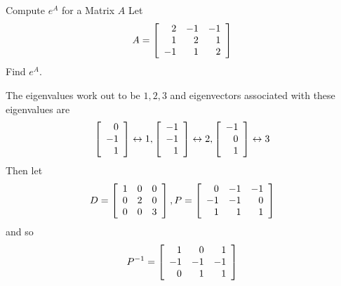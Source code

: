 \begin{example}{Compute $e^A$ for a Matrix $A$}{}
Let
\begin{equation*}
A=\left[
\begin{array}{rrr}
2 & -1 & -1 \\
1 & 2 & 1 \\
-1 & 1 & 2
\end{array}
\right]
\end{equation*}
Find $e^{A}$.
\end{example}

\begin{solution}
The eigenvalues work out to be $1,2,3$ and eigenvectors associated with these
eigenvalues are 
\begin{equation*}
\left[ 
\begin{array}{r}
0 \\ 
-1 \\ 
1
\end{array}
\right] \leftrightarrow 1,
\left[ 
\begin{array}{r}
-1 \\ 
-1 \\ 
1
\end{array}
\right] \leftrightarrow 2,\left[ 
\begin{array}{r}
-1 \\ 
0 \\ 
1
\end{array}
\right] \leftrightarrow 3
\end{equation*}
Then let 
\begin{equation*}
D=\left[ 
\begin{array}{rrr}
1 & 0 & 0 \\ 
0 & 2 & 0 \\ 
0 & 0 & 3
\end{array}
\right], P=\left[ 
\begin{array}{rrr}
0 & -1 & -1 \\ 
-1 & -1 & 0 \\ 
1 & 1 & 1
\end{array}
\right]
\end{equation*}
and so 
\begin{equation*}
P^{-1}=\left[ 
\begin{array}{rrr}
1 & 0 & 1 \\ 
-1 & -1 & -1 \\ 
0 & 1 & 1
\end{array}
\right]
\end{equation*}


\end{solution}
